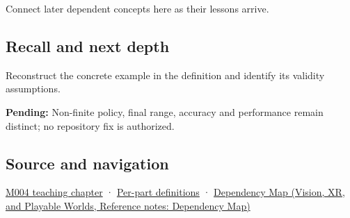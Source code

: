 Connect later dependent concepts here as their lessons arrive.

\subsection{Recall and next depth}\label{appendix-7f1e17dcafb1-recall-and-next-depth}

Reconstruct the concrete example in the definition and identify its validity assumptions.

\textbf{Pending:} Non-finite policy, final range, accuracy and performance remain distinct; no repository fix is authorized.

\subsection{Source and navigation}\label{appendix-7f1e17dcafb1-source-and-navigation}

\hyperref[01-foundations-i-ch001-a-stretching-ruler-for-real-valued-quantities]{M004 teaching chapter} · \hyperref[appendix-fd090d982a15-m004---parts-61-76]{Per-part definitions} · \href{../07-Vision-XR-and-Playable-Worlds/main.pdf\#nameddest=appendix-4ad47bdd269a}{Dependency Map (Vision, XR, and Playable Worlds, Reference notes: Dependency Map)}
